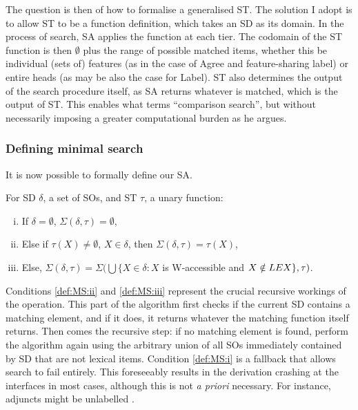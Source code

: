 The question is then of how to formalise a generalised ST. The solution I adopt is to allow ST to be a function definition, which takes an SD as its domain. In the process of search, SA applies the function at each tier. The codomain of the ST function is then $\emptyset$ plus the range of possible matched items, whether this be individual (sets of) features (as in the case of Agree and feature-sharing label) or entire heads (as may be also the case for Label). ST also determines the output of the search procedure itself, as SA returns whatever is matched, which is the output of ST. This enables what \textcite[23]{ShimJY_2018} terms ``comparison search'', but without necessarily imposing a greater computational burden as he argues.

\subsubsection{Defining minimal search}\label{sec:453}

It is now possible to formally define our SA.

\begin{definition}\label{def:MS}
    For SD $\delta$, a set of SOs, and ST $\tau$, a unary function:
    \begin{enumerate}[(i)]
        \item\label{def:MS:i}
            If $\delta = \emptyset$, $\Sigma(\delta,\tau) = \emptyset$,
        \item\label{def:MS:ii}
            Else if $\tau(X) \neq \emptyset$, $X \in \delta$, then $\Sigma(\delta,\tau)=\tau(X)$,
        \item\label{def:MS:iii} 
            Else, $\Sigma(\delta,\tau) = \Sigma(\bigcup\{X \in \delta : X$ is W-accessible and $X \notin LEX\},\tau)$.
    \end{enumerate}
\end{definition}
\noindent
Conditions \ref{def:MS:ii} and \ref{def:MS:iii} represent the crucial recursive workings of the operation. This part of the algorithm first checks if the current SD contains a matching element, and if it does, it returns whatever the matching function itself returns. Then comes the recursive step: if no matching element is found, perform the algorithm again using the arbitrary union of all SOs immediately contained by SD that are not lexical items. Condition \ref{def:MS:i} is a fallback that allows search to fail entirely. This foreseeably results in the derivation crashing at the interfaces in most cases, although this is not \textit{a priori} necessary. For instance, adjuncts might be unlabelled \parencite[see][]{BlumelA_2017a}.

